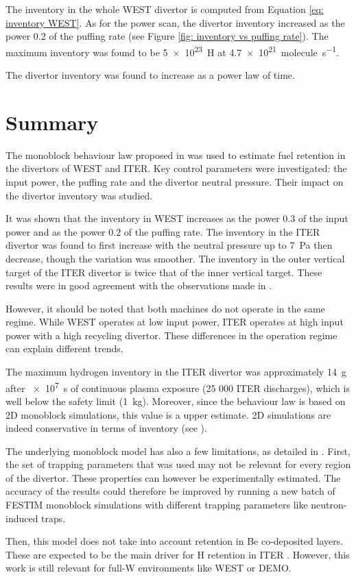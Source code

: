 The inventory in the whole WEST divertor is computed from Equation \eqref{eq: inventory WEST}.
As for the power scan, the divertor inventory increased as the power 0.2 of the puffing rate (see Figure \ref{fig: inventory vs puffing rate}).
The maximum inventory was found to be \SI{5e23}{H} at \SI{4.7e21}{molecule.s^{-1}}.

The divertor inventory was found to increase as a power law of time.

\section{Summary}


The monoblock behaviour law proposed in  was used to estimate fuel retention in the divertors of WEST and ITER.
Key control parameters were investigated: the input power, the puffing rate and the divertor neutral pressure.
Their impact on the divertor inventory was studied.

It was shown that the inventory in WEST increases as the power $0.3$ of the input power and as the power $0.2$ of the puffing rate.
The inventory in the ITER divertor was found to first increase with the neutral pressure up to \SI{7}{Pa} then decrease, though the variation was smoother.
The inventory in the outer vertical target of the ITER divertor is twice that of the inner vertical target.
These results were in good agreement with the observations made in .

However, it should be noted that both machines do not operate in the same regime.
While WEST operates at low input power, ITER operates at high input power with a high recycling divertor.
These differences in the operation regime can explain different trends.

The maximum hydrogen inventory in the ITER divertor was approximately \SI{14}{g} after \SI{e7}{s} of continuous plasma exposure (25 000 ITER discharges), which is well below the safety limit (\SI{1}{kg}).
Moreover, since the behaviour law is based on 2D monoblock simulations, this value is a upper estimate.
2D simulations are indeed conservative in terms of inventory (see ).

The underlying monoblock model has also a few limitations, as detailed in .
First, the set of trapping parameters that was used may not be relevant for every region of the divertor.
These properties can however be experimentally estimated.
The accuracy of the results could therefore be improved by running a new batch of FESTIM monoblock simulations with different trapping parameters like neutron-induced traps.

Then, this model does not take into account retention in Be co-deposited layers.
These are expected to be the main driver for H retention in ITER .
However, this work is still relevant for full-W environments like WEST or DEMO.
